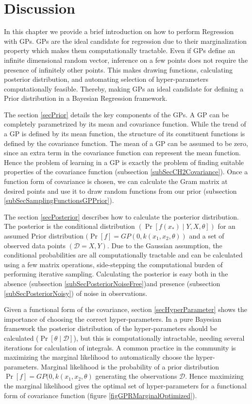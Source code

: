 \section{Discussion}\label{secCH2Discussion}
In this chapter we provide a brief introduction on how to perform Regression with GPs. GPs are the ideal candidate for regression due to their marginalization property which makes them computationally tractable. Even if GPs define an infinite dimensional random vector, inference on a few points does not require the presence of infinitely other points. This makes drawing functions, calculating posterior distribution, and automating selection of hyper-parameters computationally feasible. Thereby, making GPs an ideal candidate for defining a Prior distribution in a Bayesian Regression framework. 

The section \ref{secPrior} details the key components of the GPs. A GP can be completely parametrized by its mean and covariance function. While the trend of a GP is defined by its mean function, the structure of its constituent functions is defined by the covariance function. The mean of a GP can be assumed to be zero, since an extra term in the covariance function can represent the mean function. Hence the problem of learning in a GP is exactly the problem of finding suitable properties of the covariance function (subsection \ref{subSecCH2Covariance}). Once a function form of covariance is chosen, we can calculate the Gram matrix at desired points and use it to draw random functions from our prior (subsection \ref{subSecSamplingFunctionsGPPrior}). 

The section \ref{secPosterior} describes how to calculate the posterior distribution. The posterior is the conditional distribution $(\Pr[f(x_{*}) \mid Y, X, \theta])$ for an assumed Prior distribution $(\Pr[f] = GP(0, k(x_{1}, x_{2}, \theta))$ and a set of observed data points $(\mathcal{D} = {X, Y})$. Due to the Gaussian assumption, the conditional probabilities are all computationally tractable and can be calculated using a few matrix operations, side-stepping the computational burden of performing iterative sampling. Calculating the posterior is easy both in the absence (subsection \ref{subSecPosteriorNoiseFree})and presence (subsection \ref{subSecPosteriorNoisy}) of noise in observations. 

Given a functional form of the covariance, section \ref{secHyperParameter} shows the importance of choosing the correct hyper-parameters. In a pure Bayesian framework the posterior distribution of the hyper-parameters should be calculated ($\Pr[\theta \mid \mathcal{D}]$), but this is computationally intractable, needing several iterations for calculation of integrals. A common practice in the community is maximizing the marginal likelihood to automatically choose the hyper-parameters. Marginal likelihood is the probability of a prior distribution $\Pr[f] = GP(0, k(x_{1}, x_{2}, \theta)$ generating the observations $\mathcal{D}$. Hence maximizing the marginal likelihood gives the optimal set of hyper-parameters for a functional form of covariance function (figure \ref{figGPRMarginalOptimized}). 

